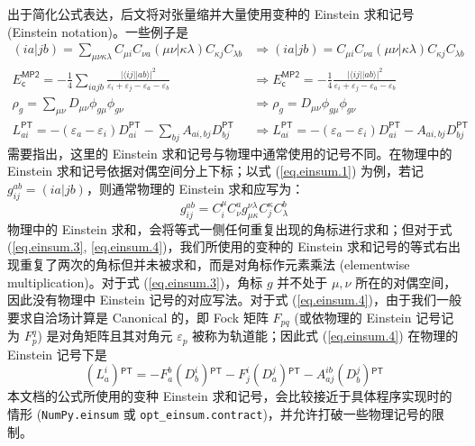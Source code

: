 出于简化公式表达，后文将对张量缩并大量使用变种的 Einstein 求和记号 (Einstein notation)。一些例子是
\begin{align}
  \label{eq.einsum.1}
  (ia|jb) = \sum_{\mu \nu \kappa \lambda} C_{\mu i} C_{\nu a} (\mu \nu | \kappa \lambda) C_{\kappa j} C_{\lambda b}
  &\Rightarrow 
  (ia|jb) = C_{\mu i} C_{\nu a} (\mu \nu | \kappa \lambda) C_{\kappa j} C_{\lambda b} \\
  \label{eq.einsum.2}
  E_\textsf{c}^\textsf{MP2} = - \frac{1}{4} \sum_{iajb} \frac{\big| \langle i j || a b \rangle \big|^2}{\varepsilon_i + \varepsilon_j - \varepsilon_a - \varepsilon_b}
  &\Rightarrow
  E_\textsf{c}^\textsf{MP2} = - \frac{1}{4} \frac{\big| \langle i j || a b \rangle \big|^2}{\varepsilon_i + \varepsilon_j - \varepsilon_a - \varepsilon_b} \\
  \label{eq.einsum.3}
  \rho_g = \sum_{\mu \nu} D_{\mu \nu} \phi_{g \mu} \phi_{g \nu}
  &\Rightarrow
  \rho_g = D_{\mu \nu} \phi_{g \mu} \phi_{g \nu} \\
  \label{eq.einsum.4}
  L_{ai}^\textsf{PT} = - (\varepsilon_a - \varepsilon_i) D_{ai}^\textsf{PT} - \sum_{bj} A_{ai, bj} D_{bj}^\textsf{PT}
  &\Rightarrow
  L_{ai}^\textsf{PT} = - (\varepsilon_a - \varepsilon_i) D_{ai}^\textsf{PT} - A_{ai, bj} D_{bj}^\textsf{PT}
\end{align}
需要指出，这里的 Einstein 求和记号与物理中通常使用的记号不同\cite{Einstein-Einstein.AP.1916}。在物理中的 Einstein 求和记号依据对偶空间分上下标；以式 (\ref{eq.einsum.1}) 为例，若记 $g_{ij}^{ab} = (ia|jb)$，则通常物理的 Einstein 求和应写为：
\begin{equation*}
  g_{ij}^{ab} = C^\mu_i C^a_\nu g^{\nu \lambda}_{\mu \kappa} C^\kappa_j C^b_\lambda
\end{equation*}
物理中的 Einstein 求和，会将等式一侧任何重复出现的角标进行求和；但对于式 (\ref{eq.einsum.3}, \ref{eq.einsum.4})，我们所使用的变种的 Einstein 求和记号的等式右出现重复了两次的角标但并未被求和，而是对角标作元素乘法 (elementwise multiplication)。对于式 (\ref{eq.einsum.3})，角标 $g$ 并不处于 $\mu, \nu$ 所在的对偶空间，因此没有物理中 Einstein 记号的对应写法。对于式 (\ref{eq.einsum.4})，由于我们一般要求自洽场计算是 Canonical 的，即 Fock 矩阵 $F_{pq}$ (或依物理的 Einstein 记号记为 $F_p^q$) 是对角矩阵且其对角元 $\varepsilon_p$ 被称为轨道能；因此式 (\ref{eq.einsum.4}) 在物理的 Einstein 记号下是
\begin{equation*}
  (L_a^i){}^\textsf{PT} = - F_a^b (D_b^i){}^\textsf{PT} - F_j^i (D_a^j){}^\textsf{PT} - A_{aj}^{ib} (D_b^j){}^\textsf{PT}
\end{equation*}
本文档的公式所使用的变种 Einstein 求和记号，会比较接近于具体程序实现时的情形 (\verb|NumPy.einsum| 或 \verb|opt_einsum.contract|)，并允许打破一些物理记号的限制。

